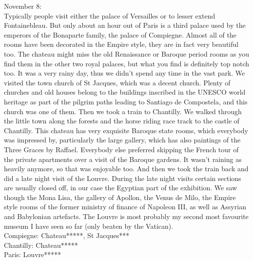 November 8:\\
Typically people visit either the palace of Versailles or to lesser extend Fontainebleau. But only about an hour out of Paris is a third palace used by the emperors of the Bonaparte family, the palace of Compiegne. Almost all of the rooms have been decorated in the Empire style, they are in fact very beautiful too. The chateau might miss the old Renaissance or Baroque period rooms as you find them in the other two royal palaces, but what you find is definitely top notch too. It was a very rainy day, thus we didn't spend any time in the vast park. We visited the town church of St Jacques, which was a decent church. Plenty of churches and old houses belong to the buildings inscribed in the UNESCO world heritage as part of the pilgrim paths leading to Santiago de Compostela, and this church was one of them. Then we took a train to Chantilly. We walked through the little town along the forests and the horse riding race track to the castle of Chantilly. This chateau has very exquisite Baroque state rooms, which everybody was impressed by, particularly the large gallery, which has also paintings of the Three Graces by Raffael. Everybody else preferred skipping the French tour of the private apartments over a visit of the Baroque gardens. It wasn't raining as heavily anymore, so that was enjoyable too. And then we took the train back and did a late night visit of the Louvre. During the late night visits certain sections are usually closed off, in our case the Egyptian part of the exhibition. We saw though the Mona Lisa, the gallery of Apollon, the Venus de Milo, the Empire style rooms of the former ministry of finance of Napoleon III, as well as Assyrian and Babylonian artefacts. The Louvre is most probably my second most favourite museum I have seen so far (only beaten by the Vatican). \\

Compiegne: Chateau*****, St Jacques***\\
Chantilly: Chateau*****\\
Paris: Louvre*****\\

